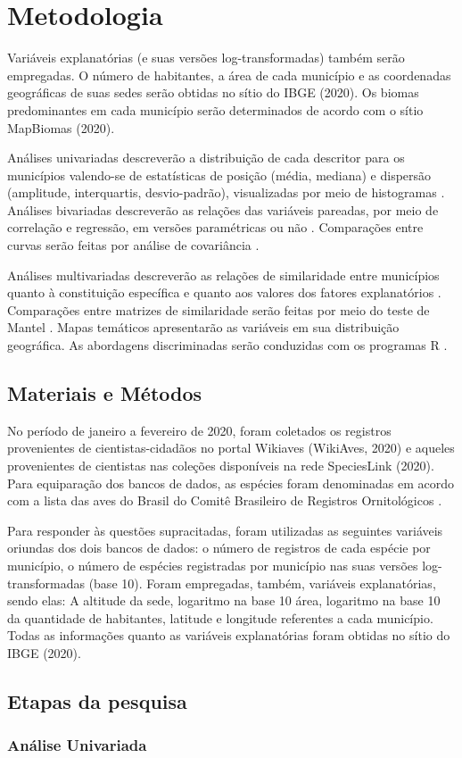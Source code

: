 \section{Metodologia}

Variáveis explanatórias (e suas versões log-transformadas) também serão empregadas. O número de habitantes, a área de cada município e as coordenadas geográficas de suas sedes serão obtidas no sítio do IBGE (2020). Os biomas predominantes em cada município serão determinados de acordo com o sítio MapBiomas (2020).

Análises univariadas descreverão a distribuição de cada descritor para os municípios valendo-se de estatísticas de posição (média, mediana) e dispersão (amplitude, interquartis, desvio-padrão), visualizadas por meio de histogramas \cite{NicholasJ.Gotelli;AaronM.Ellison2010,Borcard2011}. Análises bivariadas descreverão as relações das variáveis pareadas, por meio de correlação e regressão, em versões paramétricas ou não \cite{NicholasJ.Gotelli;AaronM.Ellison2010,Borcard2011}. Comparações entre curvas serão feitas por análise de covariância \cite{NicholasJ.Gotelli;AaronM.Ellison2010,Borcard2011}.

Análises multivariadas descreverão as relações de similaridade entre municípios quanto à constituição específica e quanto aos valores dos fatores explanatórios \cite{NicholasJ.Gotelli;AaronM.Ellison2010,Borcard2011}. Comparações entre matrizes de similaridade serão feitas por meio do teste de Mantel \cite{Borcard2011}. Mapas temáticos apresentarão as variáveis em sua distribuição geográfica. As abordagens discriminadas serão conduzidas com os programas R \cite{CoreTeam2017}.


\subsection{Materiais e Métodos}

No período de janeiro a fevereiro de 2020, foram coletados os registros provenientes de cientistas-cidadãos no portal Wikiaves (WikiAves, 2020) e aqueles provenientes de cientistas nas coleções disponíveis na rede SpeciesLink (2020). Para equiparação dos bancos de dados, as espécies foram denominadas em acordo com a lista das aves do Brasil do Comitê Brasileiro de Registros Ornitológicos \cite{De2015}.

Para responder às questões supracitadas, foram utilizadas as seguintes variáveis oriundas dos dois bancos de dados: o número de registros de cada espécie por município, o número de espécies registradas por município nas suas versões log-transformadas (base 10). Foram empregadas, também, variáveis explanatórias, sendo elas: A altitude da sede, logaritmo na base 10 área, logaritmo na base 10 da quantidade de habitantes, latitude e longitude referentes a cada município. Todas as informações quanto as variáveis explanatórias foram obtidas no sítio do IBGE (2020).

\subsection{Etapas da pesquisa}

\subsubsection{Análise Univariada}
